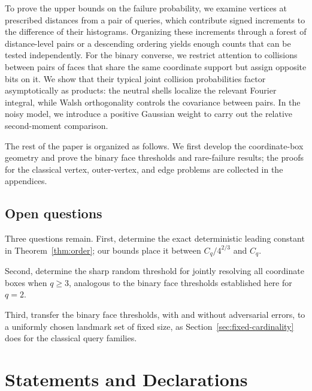 \documentclass[11pt]{article}
\theoremstyle{definition}
\begin{document}
To prove the upper bounds on the failure probability, we examine vertices at prescribed distances from a pair of queries, which contribute signed increments to the difference of their histograms. Organizing these increments through a forest of distance-level pairs or a descending ordering yields enough counts that can be tested independently. For the binary converse, we restrict attention to collisions between pairs of faces that share the same coordinate support but assign opposite bits on it. We show that their typical joint collision probabilities factor asymptotically as products: the neutral shells localize the relevant Fourier integral, while Walsh orthogonality \cite{ODonnell} controls the covariance between pairs. In the noisy model, we introduce a positive Gaussian weight to carry out the relative second-moment comparison.

The rest of the paper is organized as follows. We first develop the coordinate-box geometry and prove the binary face thresholds and rare-failure results; the proofs for the classical vertex, outer-vertex, and edge problems are collected in the appendices.

\subsection{Open questions}
Three questions remain. First, determine the exact deterministic leading constant in Theorem~\ref{thm:order}; our bounds place it between \(C_q/4^{2/3}\) and \(C_q\).

Second, determine the sharp random threshold for jointly resolving all coordinate boxes when \(q\ge3\), analogous to the binary face thresholds established here for \(q=2\).

Third, transfer the binary face thresholds, with and without adversarial errors, to a uniformly chosen landmark set of fixed size, as Section~\ref{sec:fixed-cardinality} does for the classical query families.








\appendix










\section*{Statements and Declarations}
\end{document}
